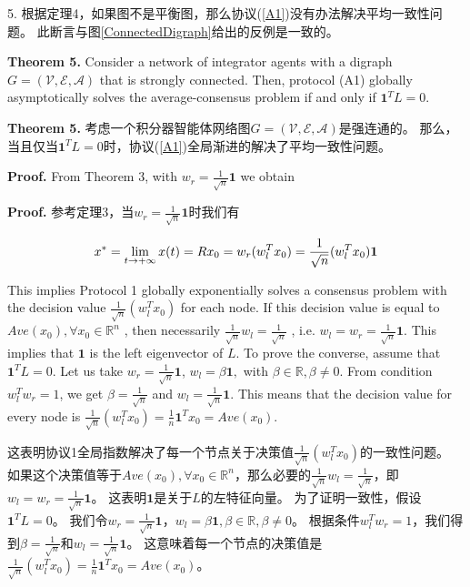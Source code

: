 \documentclass{article}
\begin{document}
 5. 根据定理4，如果图不是平衡图，那么协议(\ref{A1})没有办法解决平均一致性问题。
此断言与图\ref{ConnectedDigraph}给出的反例是一致的。

{\color[gray]{0.5}
\noindent \textbf{Theorem 5.} Consider a network of integrator agents with a digraph $G=(\mathcal{V}, \mathcal{E}, \mathcal{A})$ that is strongly connected. 
Then, protocol (A1) globally asymptotically solves the average-consensus problem if and only if $\mathbf{1}^TL=0$.
}

\noindent \textbf{Theorem 5.} 考虑一个积分器智能体网络图$G=(\mathcal{V}, \mathcal{E}, \mathcal{A})$是强连通的。
那么，当且仅当$\mathbf{1}^TL=0$时，协议(\ref{A1})全局渐进的解决了平均一致性问题。

{\color[gray]{0.5}
\noindent \textbf{Proof.} From Theorem 3, with $w_r = \frac{1}{\sqrt{n}}\mathbf{1}$ we obtain 
}

\noindent \textbf{Proof.} 参考定理3，当$w_r = \frac{1}{\sqrt{n}}\mathbf{1}$时我们有

\begin{equation}
    x^* = \lim_{t\rightarrow +\infty}x(t) = Rx_0 = w_r(w_l^T x_0) = \frac{1}{\sqrt{n}}(w_l^Tx_0)\mathbf{1}
    \notag
\end{equation}

{\color[gray]{0.5}
\noindent This implies Protocol 1 globally exponentially solves a consensus problem with the decision value $\frac{1}{\sqrt{n}}(w_l^Tx_0)$ for each node. 
If this decision value is equal to $Ave(x_0), \forall x_0 \in \mathbb{R}^n$ , then necessarily $\frac{1}{\sqrt{n}}w_l = \frac{1}{\sqrt{n}}$ , i.e. $w_l= w_r=\frac{1}{\sqrt{n}}\mathbf{1}$. 
This implies that $\mathbf{1}$ is the left eigenvector of $L$. 
To prove the converse, assume that $\mathbf{1}^TL=0$. 
Let us take $w_r=\frac{1}{\sqrt{n}}\mathbf{1}$, $w_l=\beta\mathbf{1},$ with $\beta\in\mathbb{R},\beta\ne0$. 
From condition $w_l^Tw_r=1$, we get $\beta=\frac{1}{\sqrt{n}}$ and $w_l=\frac{1}{\sqrt{n}}\mathbf{1}$. 
This means that the decision value for every node is $\frac{1}{\sqrt{n}}(w_l^Tx_0)=\frac{1}{n}\mathbf{1}^Tx_0=Ave(x_0)$.
}

\noindent 这表明协议1全局指数解决了每一个节点关于决策值$\frac{1}{\sqrt{n}}(w_l^Tx_0)$的一致性问题。
如果这个决策值等于$Ave(x_0), \forall x_0 \in \mathbb{R}^n$，那么必要的$\frac{1}{\sqrt{n}}w_l = \frac{1}{\sqrt{n}}$，即$w_l= w_r=\frac{1}{\sqrt{n}}\mathbf{1}$。
这表明$\mathbf{1}$是关于$L$的左特征向量。
为了证明一致性，假设$\mathbf{1}^TL=0$。
我们令$w_r=\frac{1}{\sqrt{n}}\mathbf{1}$，$w_l=\beta\mathbf{1},\beta\in\mathbb{R},\beta\ne0$。
根据条件$w_l^Tw_r=1$，我们得到$\beta=\frac{1}{\sqrt{n}}$和$w_l=\frac{1}{\sqrt{n}}\mathbf{1}$。
这意味着每一个节点的决策值是$\frac{1}{\sqrt{n}}(w_l^Tx_0)=\frac{1}{n}\mathbf{1}^Tx_0=Ave(x_0)$。
\end{document}
